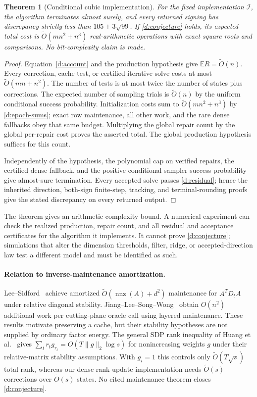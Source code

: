 \documentclass[11pt]{amsart}
\newtheorem{theorem}{Theorem}[section]
\theoremstyle{definition}\newtheorem{definition}[theorem]{Definition}
\theoremstyle{remark}\newtheorem{remark}[theorem]{Remark}
\numberwithin{equation}{section}
\begin{document}
\begin{theorem}[Conditional cubic implementation]\label{d:conditional}
For the fixed implementation $\mathcal I$, the algorithm terminates
almost surely, and every returned signing has discrepancy strictly less
than $105+3\sqrt{99}$. If \eqref{d:conjecture} holds, its expected total
cost is $\widetilde O(mn^2+n^3)$ real-arithmetic operations with exact
square roots and comparisons. No bit-complexity claim is made.
\end{theorem}
\begin{proof}
Equation~\eqref{d:account} and the production hypothesis give
$\mathbb ER=\widetilde O(n)$. Every correction, cache test, or certified
iterative solve costs at most $\widetilde O(mn+n^2)$. The number of tests
is at most twice the number of states plus corrections. The expected
number of sampling trials is $\widetilde O(n)$ by the uniform conditional
success probability. Initialization costs sum to
$\widetilde O(mn^2+n^3)$ by \eqref{d:epoch-sums}; exact row maintenance,
all other work, and the rare dense fallbacks obey that same budget.
Multiplying the global repair count by the global per-repair cost proves
the asserted total. The global production hypothesis suffices for this count.

Independently of the hypothesis, the polynomial cap on verified repairs,
the certified dense fallback, and the positive conditional sampler
success probability give almost-sure termination. Every accepted solve
passes \eqref{d:residual}; hence the inherited direction, both-sign
finite-step, tracking, and terminal-rounding proofs give the stated
discrepancy on every returned output.
\end{proof}

The theorem gives an arithmetic complexity bound. A numerical experiment can
check the realized production, repair count, and all residual and
acceptance certificates for the algorithm it implements. It cannot prove
\eqref{d:conjecture}; simulations that alter the dimension thresholds,
filter, ridge, or accepted-direction law test a different model and must
be identified as such.


\paragraph{Relation to inverse-maintenance amortization.}
Lee--Sidford~\cite{LSmaint} achieve amortized
$\widetilde O(\operatorname{nnz}(A)+d^2)$ maintenance for $A^TD_tA$
under relative diagonal stability. Jiang--Lee--Song--Wong~\cite{JLSW}
obtain $O(n^2)$ additional work per cutting-plane oracle call using
layered maintenance. These results motivate preserving a cache, but
their stability hypotheses are not supplied by ordinary factor energy.
The general SDP rank inequality of Huang et al.~\cite{HJSTZ} gives
$\sum_t r_tg_{r_t}=O(T\|g\|_2\log s)$ for nonincreasing weights $g$
under their relative-matrix stability assumptions. With $g_i=1$ this
controls only $\widetilde O(T\sqrt s)$ total rank, whereas our dense
rank-update implementation needs $\widetilde O(s)$ corrections over
$\widetilde O(s)$ states. No cited maintenance theorem closes
\eqref{d:conjecture}.
\end{document}

